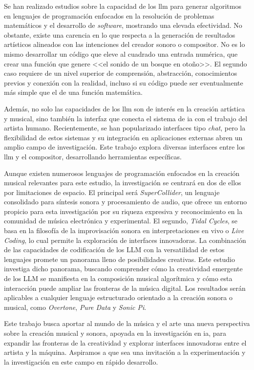 Se han realizado estudios sobre la capacidad de los \gls{llm} para generar algoritmos en lenguajes de programación enfocados en la resolución de problemas matemáticos y el desarrollo de \emph{software}, mostrando una elevada efectividad. No obstante, existe una carencia en lo que respecta a la generación de resultados artísticos alineados con las intenciones del creador sonoro o compositor. No es lo mismo desarrollar un código que eleve al cuadrado una entrada numérica, que crear una función que genere <<el sonido de un bosque en otoño>>. El segundo caso requiere de un nivel superior de comprensión, abstracción, conocimientos previos y conexión con la realidad, incluso si su código puede ser eventualmente más simple que el de una función matemática.

Además, no solo las capacidades de los \gls{llm} son de interés en la creación artística y musical, sino también la interfaz que conecta el sistema de \gls{ia} con el trabajo del artista humano. Recientemente, se han popularizado interfaces tipo \emph{chat}, pero la flexibilidad de estos sistemas y su integración en aplicaciones externas abren un amplio campo de investigación. Este trabajo explora diversas interfaces entre los \gls{llm} y el compositor, desarrollando herramientas específicas.

Aunque existen numerosos lenguajes de programación enfocados en la creación musical relevantes para este estudio, la investigación se centrará en dos de ellos por limitaciones de espacio. El principal será \emph{SuperCollider}, un lenguaje consolidado para síntesis sonora y procesamiento de audio, que ofrece un entorno propicio para esta investigación por su riqueza expresiva y reconocimiento en la comunidad de música electrónica y experimental. El segundo, \emph{Tidal Cycles}, se basa en la filosofía de la improvisación sonora en interpretaciones en vivo o \emph{Live Coding}, lo cual permite la exploración de interfaces innovadoras. La combinación de las capacidades de codificación de los LLM con la versatilidad de estos lenguajes promete un panorama lleno de posibilidades creativas. Este estudio investiga dicho panorama, buscando comprender cómo la creatividad emergente de los LLM se manifiesta en la composición musical algorítmica y cómo esta interacción puede ampliar las fronteras de la música digital. Los resultados serán aplicables a cualquier lenguaje estructurado orientado a la creación sonora o musical, como \emph{Overtone}, \emph{Pure Data} y \emph{Sonic Pi}.

Este trabajo busca aportar al mundo de la música y el arte una nueva perspectiva sobre la creación musical y sonora, apoyada en la investigación en \gls{ia}, para expandir las fronteras de la creatividad y explorar interfaces innovadoras entre el artista y la máquina. Aspiramos a que sea una invitación a la experimentación y la investigación en este campo en rápido desarrollo.

